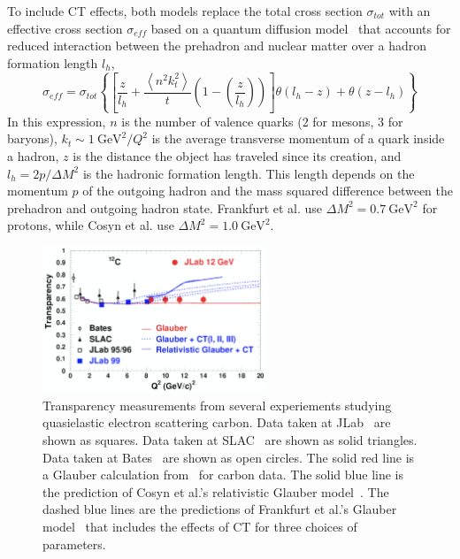 To include CT effects, both models replace the total cross section
$\sigma_{tot}$ with an effective cross section $\sigma_{eff}$
based on a quantum diffusion model~\cite{Farrar_1988}
that accounts for reduced interaction between the prehadron and nuclear matter
over a hadron formation length $l_h$,
\begin{equation}
    \sigma_{eff} = \sigma_{tot}
    \left\{
        \left[\frac{z}{l_h} +
               \frac{\left\langle n^{2} k_{t}^{2}\right\rangle}{t} \left(1-\left(\frac{z}{l_h}\right)\right)
        \right]
        \theta\left(l_h-z\right) +
        \theta\left(z-l_h\right)
    \right\}
\end{equation}
In this expression,
$n$ is the number of valence quarks (2 for mesons, 3 for baryons),
$k_t \sim \SI{1}{\giga\electronvolt\squared}/Q^2$
is the average transverse momentum of a quark inside a hadron,
$z$ is the distance the object has traveled since its creation,
and
$l_h=2p/\Delta M^2$ is the hadronic formation length.
This length depends on
the momentum $p$ of the outgoing hadron
and
the mass squared difference between the prehadron and outgoing hadron state.
Frankfurt et al. use $\Delta M^2 = \SI{0.7}{\giga\electronvolt\squared}$
for protons, while
Cosyn et al. use $\Delta M^2 = \SI{1.0}{\giga\electronvolt\squared}$.

\begin{figure}[!h]
    \centering
    \includegraphics[width=0.6\textwidth]{chap1/c12eep_measurements_and_predictions.png}
    \caption{Transparency measurements from several experiements studying
             quasielastic electron scattering carbon.
             Data taken at JLab~\cite{Abbot_1998, Garrow_2002, Rohe_2005} are shown as squares.
             Data taken at SLAC~\cite{Makins_1994, ONeill_1995} are shown as solid triangles.
             Data taken at Bates~\cite{Garino_1992} are shown as open circles.
             The solid red line is a Glauber calculation from~\cite{Pandharipande_1992} for carbon data.
             The solid blue line is the prediction of Cosyn et al.'s
             relativistic Glauber model~\cite{Cosyn_2006, Cosyn_2008}.
             The dashed blue lines are the predictions of Frankfurt et al.'s
             Glauber model~\cite{Frankfurt_1995_PRC} that includes the effects of CT for three choices of
             parameters.
            }
    \label{fig:c12eep_transparency_intro}
\end{figure}


